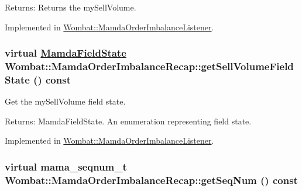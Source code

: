 \begin{Desc}
\item[Returns:]Returns the my\-Sell\-Volume. \end{Desc}


Implemented in \hyperlink{classWombat_1_1MamdaOrderImbalanceListener_fce0392a0c33cf57e534908cb29cd10e}{Wombat::Mamda\-Order\-Imbalance\-Listener}.\hypertarget{classWombat_1_1MamdaOrderImbalanceRecap_cc07b533268359fb2a968d83ffe618be}{
\subsubsection[getSellVolumeFieldState]{\setlength{\rightskip}{0pt plus 5cm}virtual \hyperlink{namespaceWombat_93aac974f2ab713554fd12a1fa3b7d2a}{Mamda\-Field\-State} Wombat::Mamda\-Order\-Imbalance\-Recap::get\-Sell\-Volume\-Field\-State () const}}
\label{classWombat_1_1MamdaOrderImbalanceRecap_cc07b533268359fb2a968d83ffe618be}


Get the my\-Sell\-Volume field state. 

\begin{Desc}
\item[Returns:]Mamda\-Field\-State. An enumeration representing field state. \end{Desc}


Implemented in \hyperlink{classWombat_1_1MamdaOrderImbalanceListener_83655805e56c6a77ef48d0b6a5129f7b}{Wombat::Mamda\-Order\-Imbalance\-Listener}.\hypertarget{classWombat_1_1MamdaOrderImbalanceRecap_2602c30d3dfd6dc8dd9aceaa33c4de24}{
\subsubsection[getSeqNum]{\setlength{\rightskip}{0pt plus 5cm}virtual mama\_\-seqnum\_\-t Wombat::Mamda\-Order\-Imbalance\-Recap::get\-Seq\-Num () const}}
\label{classWombat_1_1MamdaOrderImbalanceRecap_2602c30d3dfd6dc8dd9aceaa33c4de24}


